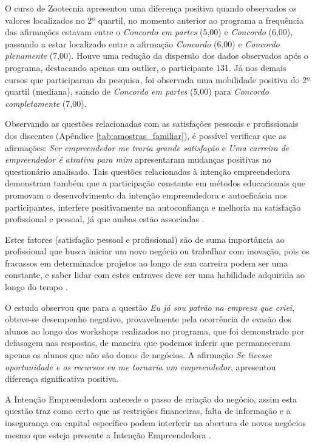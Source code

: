 O curso de Zootecnia apresentou uma diferença positiva quando observados os valores localizados no 2º quartil, no momento anterior ao programa a frequência das afirmações estavam entre o \textit{Concordo em partes} (5,00) e \textit{Concordo} (6,00), passando a estar localizado entre a afirmação \textit{Concordo} (6,00) e \textit{Concordo plenamente} (7,00). Houve uma redução da dispersão dos dados observados após o programa, destacando apenas um outlier, o participante 131. Já nos demais cursos que participaram da pesquisa, foi observada uma mobilidade positiva do 2º quartil (mediana), saindo de \textit{Concordo em partes} (5,00) para \textit{Concordo completamente} (7,00).

Observando as questões relacionadas com as satisfações pessoais e profissionais dos discentes (Apêndice \ref{tab:amostras_familiar}), é possível verificar que as afirmações: \textit{Ser empreendedor me traria grande satisfação} e \textit{Uma carreira de empreendedor é atrativa para mim} apresentaram mudanças positivas no questionário analisado. Tais questões relacionadas à intenção empreendedora demonstram também que a participação constante em métodos educacionais que promovam o desenvolvimento da intenção empreendedora e autoeficácia nos participantes, interfere positivamente na autoconfiança e melhoria na satisfação profissional e pessoal, já que ambas estão associadas \cite{nassar_junior_fatores_2016}.

Estes fatores (satisfação pessoal e profissional) são de suma importância ao profissional que busca iniciar um novo negócio ou trabalhar com inovação, pois os fracassos em determinados projetos ao longo de sua carreira podem ser uma constante, e saber lidar com estes entraves deve ser uma habilidade adquirida ao longo do tempo \cite{edelman_impact_2016}.

O estudo observou que para a questão \textit{Eu já sou patrão na empresa que criei}, obteve-se desempenho negativo, provavelmente pela ocorrência de evasão dos alunos ao longo dos workshops realizados no programa, que foi demonstrado por defasagem nas respostas, de maneira que podemos inferir que permaneceram apenas os alunos que não são donos de negócios. A afirmação \textit{Se tivesse oportunidade e os recursos eu me tornaria um empreendedor}, apresentou diferença significativa positiva. 

A Intenção Empreendedora antecede o passo de criação do negócio, assim esta questão traz como certo que as restrições financeiras, falta de informação e a insegurança em capital específico podem interferir na abertura de novos negócios mesmo que esteja presente a Intenção Empreendedora \cite{auguste_what_2016}.

